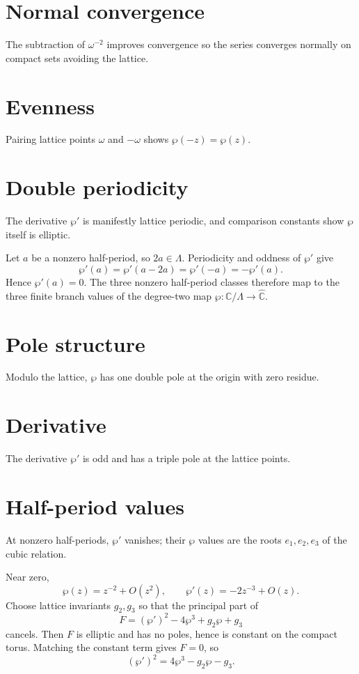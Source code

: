 \section{Normal convergence}
The subtraction of $\omega^{-2}$ improves convergence so the series converges normally on compact sets avoiding the lattice.

\section{Evenness}
Pairing lattice points $\omega$ and $-\omega$ shows $\wp(-z)=\wp(z)$.

\section{Double periodicity}
The derivative $\wp'$ is manifestly lattice periodic, and comparison constants show $\wp$ itself is elliptic.

\begin{example}\label{ex:iv29-expand-02}
Let \(a\) be a nonzero half-period, so \(2a\in\Lambda\). Periodicity and oddness of \(\wp'\) give
\[
\wp'(a)=\wp'(a-2a)=\wp'(-a)=-\wp'(a).
\]
Hence \(\wp'(a)=0\). The three nonzero half-period classes therefore map to the three finite branch values of the degree-two map \(\wp:\mathbb C/\Lambda\to\widehat{\mathbb C}\).
\end{example}
\section{Pole structure}
Modulo the lattice, $\wp$ has one double pole at the origin with zero residue.

\section{Derivative}
The derivative $\wp'$ is odd and has a triple pole at the lattice points.

\section{Half-period values}
At nonzero half-periods, $\wp'$ vanishes; their $\wp$ values are the roots $e_1,e_2,e_3$ of the cubic relation.

\begin{example}\label{ex:iv29-expand-03}
Near zero,
\[
\wp(z)=z^{-2}+O(z^2),\qquad \wp'(z)=-2z^{-3}+O(z).
\]
Choose lattice invariants \(g_2,g_3\) so that the principal part of
\[
F=(\wp')^2-4\wp^3+g_2\wp+g_3
\]
cancels. Then \(F\) is elliptic and has no poles, hence is constant on the compact torus. Matching the constant term gives \(F=0\), so
\[
(\wp')^2=4\wp^3-g_2\wp-g_3.
\]
\end{example}

